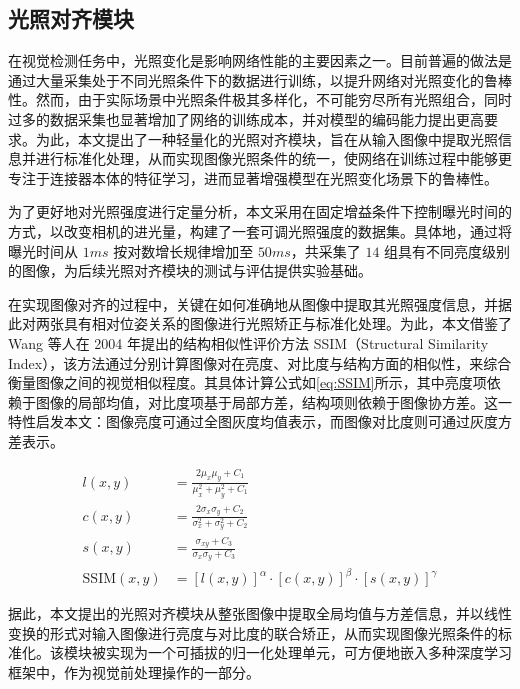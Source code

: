 \documentclass{Diploma}
\begin{document}
\subsection{光照对齐模块}
在视觉检测任务中，光照变化是影响网络性能的主要因素之一。目前普遍的做法是通过大量采集处于不同光照条件下的数据进行训练，以提升网络对光照变化的鲁棒性。然而，由于实际场景中光照条件极其多样化，不可能穷尽所有光照组合，同时过多的数据采集也显著增加了网络的训练成本，并对模型的编码能力提出更高要求。为此，本文提出了一种轻量化的光照对齐模块，旨在从输入图像中提取光照信息并进行标准化处理，从而实现图像光照条件的统一，使网络在训练过程中能够更专注于连接器本体的特征学习，进而显著增强模型在光照变化场景下的鲁棒性。

为了更好地对光照强度进行定量分析，本文采用在固定增益条件下控制曝光时间的方式，以改变相机的进光量，构建了一套可调光照强度的数据集。具体地，通过将曝光时间从 $1ms$ 按对数增长规律增加至 $50ms$，共采集了 $14$ 组具有不同亮度级别的图像，为后续光照对齐模块的测试与评估提供实验基础。

在实现图像对齐的过程中，关键在如何准确地从图像中提取其光照强度信息，并据此对两张具有相对位姿关系的图像进行光照矫正与标准化处理。为此，本文借鉴了 Wang 等人在 2004 年提出的结构相似性评价方法 SSIM（Structural Similarity Index）\cite{wang2004image}，该方法通过分别计算图像对在亮度、对比度与结构方面的相似性，来综合衡量图像之间的视觉相似程度。其具体计算公式如\eqref{eq:SSIM}所示，其中亮度项依赖于图像的局部均值，对比度项基于局部方差，结构项则依赖于图像协方差。这一特性启发本文：图像亮度可通过全图灰度均值表示，而图像对比度则可通过灰度方差表示。

\begin{equation} \label{eq:SSIM}
\begin{aligned}
l(x, y) &= \frac{2\mu_x \mu_y + C_1}{\mu_x^2 + \mu_y^2 + C_1} \\
c(x, y) &= \frac{2\sigma_x \sigma_y + C_2}{\sigma_x^2 + \sigma_y^2 + C_2} \\
s(x, y) &= \frac{\sigma_{xy} + C_3}{\sigma_x \sigma_y + C_3} \\
\text{SSIM}(x, y) &= [l(x, y)]^\alpha \cdot [c(x, y)]^\beta \cdot [s(x, y)]^\gamma
\end{aligned}
\end{equation}

据此，本文提出的光照对齐模块从整张图像中提取全局均值与方差信息，并以线性变换的形式对输入图像进行亮度与对比度的联合矫正，从而实现图像光照条件的标准化。该模块被实现为一个可插拔的归一化处理单元，可方便地嵌入多种深度学习框架中，作为视觉前处理操作的一部分。
\end{document}
